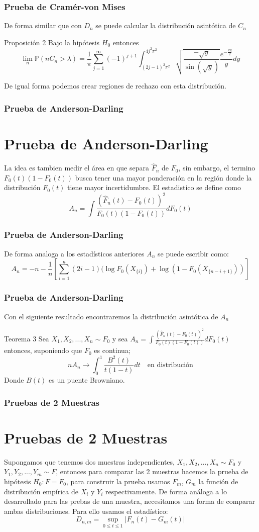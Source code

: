 \documentclass[aspectratio=169,spanish]{beamer}
\begin{document}
\begin{frame}
\frametitle{Prueba de Cramér-von Mises}
De forma similar que con $D_n$ se puede calcular la distribución asintótica de $C_n$
\begin{block}{Proposición 2}
Bajo la hipótesis $H_0$ entonces 
$$ \lim_{n}\mathbb{P}(n C_n > \lambda)=\frac{1}{\pi}\sum_{j=1}^{\infty}(-1)^{j+1}\int_{(2j-1)^2\pi^2}^{4j^2\pi^2}\sqrt{\frac{-\sqrt{y}}{\sin(\sqrt{y})}}\frac{e^{-\frac{xy}{2}}}{y}dy$$
\end{block}
De igual forma podemos crear regiones de rechazo con esta distribución.
\end{frame}






\begin{frame}
\frametitle{Prueba de Anderson-Darling}
\section{Prueba de Anderson-Darling}
La idea es tambien medir el área en que separa $\hat{F}_n$ de $F_0$, sin embargo, el termino $F_0(t)(1-F_0(t))$ busca tener una mayor ponderación en la región donde la distribución $F_0(t)$ tiene mayor incertidumbre. El estadistico se define como 
$$A_n=\int\frac{(\hat{F}_n(t)-F_0(t))^2}{F_0(t)(1-F_0(t))}dF_0(t)$$
\end{frame}
\begin{frame}
\frametitle{Prueba de Anderson-Darling}
De forma analoga a los estadísticos anteriores $A_n$ se puede escribir como:
$$A_n=-n-\frac{1}{n}\left[\sum_{i=1}^{n}(2i-1)(\log F_0(X_{\{i\}})+\log(1-F_0(X_{\{n-i+1\}}))\right]$$
\end{frame}
\begin{frame}
\frametitle{Prueba de Anderson-Darling}
Con el siguiente resultado encontraremos la distribución asintótica de $A_n$
\begin{block}{Teorema 3}
Sea $X_1,X_2,...,X_n\sim F_0$ y sea $A_n=\int\frac{(\hat{F}_n(t)-F_0(t))^2}{F_0(t)(1-F_0(t))}dF_0(t)$ entonces, suponiendo que $F_0$ es continua; $$nA_n \rightarrow \int_0^1\frac{B^2(t)}{t(1-t)}dt\quad \text{en distribución}$$
Donde $B(t)$ es un puente Browniano.
\end{block}
\end{frame}

\begin{frame}
\frametitle{Pruebas de 2 Muestras}
\section{Pruebas de 2 Muestras}
Supongamos que tenemos dos muestras independientes, $X_1,X_2,...,X_n\sim F_0$ y $Y_1,Y_2,...,Y_m\sim F$, entonces para comparar las 2 muestras hacemos la prueba de hipótesis $H_0: F=F_0$, para construir la prueba usamos $F_m$, $G_m$ la función de distribución empírica de $X_i$ y $Y_i$ respectivamente. De forma análoga a lo desarrollado para las prebas de una muestra, necesitamos una forma de comparar ambas distribuciones. Para ello usamos el estadístico: 
$$D_{n,m} = \sup_{0\le t\le 1}|F_n(t)-G_m(t)|$$

\end{frame}
\end{document}
